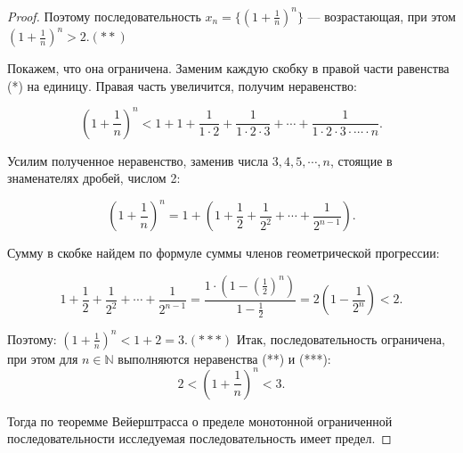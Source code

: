 \begin{proof}
        Поэтому последовательность ${x_n} =  \{ (1+\frac{1}{n})^{n}\}$  — возрастающая, при этом $(1+\frac{1}{n})^{n}>2. (**)$

        Покажем, что она ограничена. Заменим каждую скобку в правой части равенства (*) на единицу. Правая часть увеличится, получим неравенство:

        $$(1+\frac{1}{n})^{n}<1+1+\frac{1}{1\cdot 2}+\frac{1}{1\cdot 2\cdot 3}+ \cdots +\frac{1}{1\cdot 2\cdot 3\cdot \cdots \cdot n}.$$

        Усилим полученное неравенство, заменив числа $3, 4, 5, \cdots, n $, стоящие в знаменателях дробей, числом 2:

        $$(1+\frac{1}{n})^{n} = 1+ (1+\frac{1}{2}+\frac{1}{2^2}+\cdots +\frac{1}{2^{n-1}}).$$

        Сумму в скобке найдем по формуле суммы членов геометрической прогрессии:

        $$1+\frac{1}{2}+\frac{1}{2^2}+ \cdots +\frac{1}{2^{n-1}} = \frac{1\cdot (1- (\frac{1}{2})^n)}{1-\frac{1}{2}}= 2 (1-\frac{1}{2^n})<2.$$

        Поэтому: $(1+\frac{1}{n})^{n}<1+2= 3. (***)$
        Итак, последовательность ограничена, при этом для $n \in \mathbb{N}$ выполняются неравенства (**) и (***):
        $$2 < (1+\frac{1}{n})^{n}<3.$$

        Тогда по теоремме Вейерштрасса о пределе монотонной ограниченной последовательности исследуемая последовательность имеет предел.
\end{proof}
